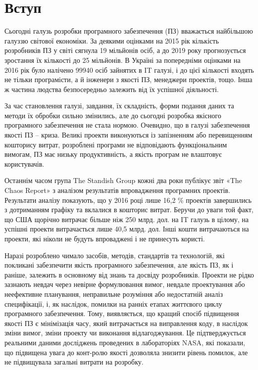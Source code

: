 \chapter*{Вступ}

Сьогодні галузь розробки програмного забезпечення (ПЗ) вважається найбільшою галуззю світової економіки. За деякими оцінками на 2015 рік кількість розробників ПЗ у світі сягнула 19 мільйонів осіб, а до 2019 року прогнозується зростання їх кількості до 25 мільйонів. В Україні за попередніми оцінками на 2016 рік було налічено 99940 осіб зайнятих в IT галузі, і до цієї кількості входять не тільки програмісти, а й інженери з якості ПЗ, менеджери проектів, тощо. Інша ж частина людства безпосередньо залежить від їх успішної діяльності.

За час становлення галузі, завдання, їх складність, форми подання даних та методи їх обробки сильно змінились, але до сьогодні розробка якісного програмного забезпечення не стала нормою. Очевидно, що в галузі забезпечення якості ПЗ – криза. Великі проекти виконуються із запізненням або перевищенням кошторису витрат, розроблені програми не відповідають функціональним вимогам, ПЗ має низьку продуктивність, а якість програм не влаштовує користувачів.

Останнім часом група The Standish Group кожні два роки публікує звіт «The Chaos Report» з аналізом результатів впровадження програмних проектів. Результати аналізу показують, що у 2016 році лише 16,2 \% проектів завершились з дотриманням графіку та вклалися в кошторис витрат. Беручи до уваги той факт, що США щорічно витрачає більше ніж 250 млрд. дол. на IT галузь в цілому, на успішні проекти витрачається лише 40,5 млрд. дол. Інші кошти витрачаються на проекти, які ніколи не будуть впроваджені і не принесуть користі.

Наразі розроблено чимало засобів, методів, стандартів та технологій, які покликані забезпечити якість програмного забезпечення, але якість ПЗ, як і раніше, залежить в основному від знань та досвіду розробників. Проекти не рідко зазнають невдач через невірне формулювання вимог, невдале проектування або неефективне планування, неправильне розуміння або недостатній аналіз специфікації, і, як наслідок, помилки на ранніх етапах життєвого циклу програмного забезпечення. Тому, виявляється, що кращий спосіб підвищення якості ПЗ є мінімізація часу, який витрачається на виправлення коду, в наслідок зміни вимог, зміни проекту чи виконання відлагоджування. Це підтверджується реальними даними досліджень проведених в лабораторіях NASA, які показали, що підвищена увага до конт-ролю якості дозволяла знизити рівень помилок, але не підвищувала загальні витрати на розробку.

